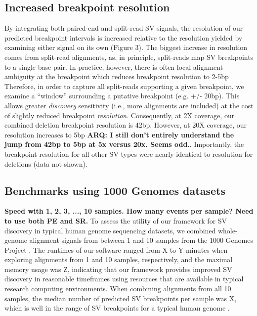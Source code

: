 \documentclass[11pt]{article}
\begin{document}
\subsection{Increased breakpoint resolution}
By integrating both paired-end and split-read SV signals, the resolution of
our predicted breakpoint intervals is increased relative to the resolution 
yielded by examining either signal on its own (Figure 3). The biggest increase
in resolution comes from split-read alignments, as, in principle, split-reads
map SV breakpoints to a single base pair. In practice, however, there is
often local alignment ambiguity at the breakpoint which reduces breakpoint 
resolution to 2-5bp \cite{Quinlan2010}. Therefore, in order to capture all
split-reads supporting a given breakpoint, we examine a ``window'' surrounding
a putative breakpoint (e.g. +/- 20bp). This allows greater \emph{discovery}
sensitivity (i.e., more alignments are included) at the cost of slightly reduced
breakpoint \emph{resolution}. Consequently, at 2X coverage, our combined
deletion breakpoint resolution is 42bp. However, at 20X coverage, our resolution
increases to 5bp \textbf{ARQ: I still don't entirely understand the jump from
42bp to 5bp at 5x versus 20x.  Seems odd.}. Importantly, the breakpoint 
resolution for all other SV types were nearly identical to resolution for 
deletions (data not shown).



\subsection{Benchmarks using 1000 Genomes datasets}
\textbf{Speed with 1, 2, 3, ..., 10 samples.  How many events per sample?
Need to use both PE and SR.}
To assess the utility of our framework for SV discovery in typical human genome
sequencing datasets, we combined whole-genome alignment signals from between 1 
and 10 samples from the 1000 Genomes Project \cite{Durbin2010}. The runtimes
of our software ranged from X to Y minutes when exploring alignments from 1 and
10 samples, respectively, and the maximal memory usage was Z, indicating that
our framework provides improved SV discovery in reasonable timeframes using
resources that are available in typical research computing environments. When
combining alignments from all 10 samples, the median number of predicted SV
breakpoints per sample was X, which is well in the range of SV 
breakpoints for a typical human genome \cite{?}.


\end{document}
